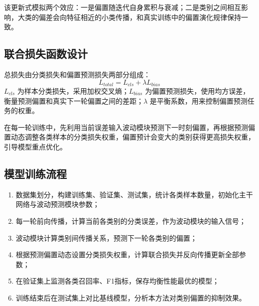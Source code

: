 \documentclass{article}
\begin{document}
该更新式模拟两个效应：一是偏置随迭代自身累积与衰减；二是类别之间相互影响，大类的偏差会向特征相近的小类传播，和真实训练中的偏置演化规律保持一致。

\subsection{联合损失函数设计}
总损失由分类损失和偏置预测损失两部分组成：
\[
L_{total}=L_{cls}+\lambda L_{bias}
\]
$L_{cls}$ 为样本分类损失，采用加权交叉熵；$L_{bias}$ 为偏置预测损失，使用均方误差，衡量预测偏置和真实下一轮偏置之间的差距；$\lambda$ 是平衡系数，用来控制偏置预测任务的权重。

在每一轮训练中，先利用当前误差输入波动模块预测下一时刻偏置，再根据预测偏置动态调整各类样本的分类损失权重，偏置预计会变大的类别获得更高损失权重，引导模型重点优化。

\subsection{模型训练流程}
\begin{enumerate}
    \item 数据集划分，构建训练集、验证集、测试集，统计各类样本数量，初始化主干网络与波动预测模块参数；
    \item 每一轮前向传播，计算当前各类别的分类误差，作为波动模块的输入信号；
    \item 波动模块计算类别间传播关系，预测下一轮各类别的偏置；
    \item 根据预测偏置动态设置分类损失权重，计算联合损失并反向传播更新全部参数；
    \item 在验证集上监测各类召回率、F1指标，保存均衡性能最优的模型；
    \item 训练结束后在测试集上对比基线模型，分析本方法对类别偏置的抑制效果。
\end{enumerate}
\end{document}
